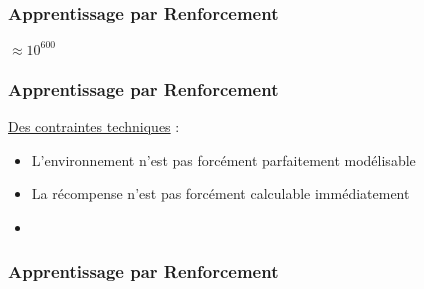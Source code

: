 \begin{frame}
  \frametitle{Apprentissage par Renforcement}
  \begin{center}
    \huge{$\approx 10^{600}$}
  \end{center}
\end{frame}

\begin{frame}
  \frametitle{Apprentissage par Renforcement}
  \underline{Des contraintes techniques} :
  \begin{itemize}
  \item L'environnement n'est pas forcément parfaitement modélisable
  \item La récompense n'est pas forcément calculable immédiatement
  \item {}
  \end{itemize}
\end{frame}

\begin{frame}
  \frametitle{Apprentissage par Renforcement}
\end{frame}

